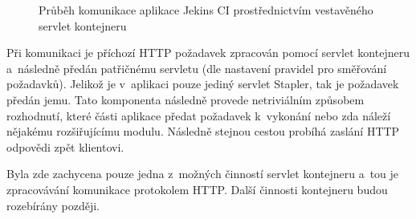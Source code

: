             \begin{figure}[h!t]
                \begin{center}
                    \caption{Průběh komunikace aplikace Jekins CI prostřednictvím vestavěného servlet kontejneru}
                    \label{imgKomunikace}
                \end{center}
            \end{figure}

            Při komunikaci je příchozí HTTP požadavek zpracován pomocí servlet kontejneru 
            a~následně předán patřičnému servletu (dle nastavení pravidel pro směřování požadavků).
            Jelikož je v~aplikaci pouze jediný servlet Stapler, tak je požadavek předán jemu.
            Tato komponenta následně provede netriviálním způsobem rozhodnutí, které
            části aplikace předat požadavek k~vykonání  nebo zda náleží nějakému rozšiřujícímu modulu.
            Následně stejnou cestou probíhá zaslání HTTP odpovědi zpět klientovi.

            Byla zde zachycena pouze jedna z~možných činností
            servlet kontejneru a~tou je zpracovávání komunikace protokolem HTTP. 
            Další činnosti kontejneru budou rozebírány později.

